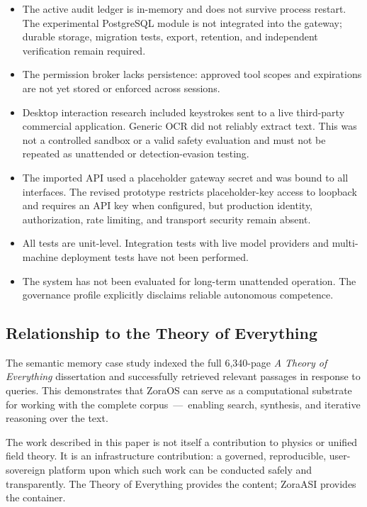\documentclass[11pt]{article}
\begin{document}
\begin{itemize}[leftmargin=*]
  \item The active audit ledger is in-memory and does not survive process restart. The experimental PostgreSQL module is not integrated into the gateway; durable storage, migration tests, export, retention, and independent verification remain required.
  \item The permission broker lacks persistence: approved tool scopes and expirations are not yet stored or enforced across sessions.
  \item Desktop interaction research included keystrokes sent to a live third-party commercial application. Generic OCR did not reliably extract text. This was not a controlled sandbox or a valid safety evaluation and must not be repeated as unattended or detection-evasion testing.
  \item The imported API used a placeholder gateway secret and was bound to all interfaces. The revised prototype restricts placeholder-key access to loopback and requires an API key when configured, but production identity, authorization, rate limiting, and transport security remain absent.
  \item All tests are unit-level. Integration tests with live model providers and multi-machine deployment tests have not been performed.
  \item The system has not been evaluated for long-term unattended operation. The governance profile explicitly disclaims reliable autonomous competence.
\end{itemize}

\subsection{Relationship to the Theory of Everything}

The semantic memory case study indexed the full 6,340-page \emph{A Theory of Everything} dissertation and successfully retrieved relevant passages in response to queries. This demonstrates that ZoraOS can serve as a computational substrate for working with the complete corpus\ ---\ enabling search, synthesis, and iterative reasoning over the text.

The work described in this paper is not itself a contribution to physics or unified field theory. It is an infrastructure contribution: a governed, reproducible, user-sovereign platform upon which such work can be conducted safely and transparently. The Theory of Everything provides the content; ZoraASI provides the container.
\end{document}
